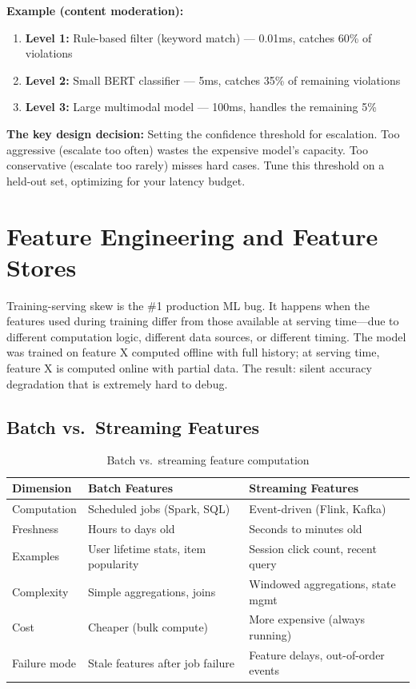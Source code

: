 \textbf{Example (content moderation):}
\begin{enumerate}
    \item \textbf{Level 1:} Rule-based filter (keyword match) --- 0.01ms, catches 60\% of violations
    \item \textbf{Level 2:} Small BERT classifier --- 5ms, catches 35\% of remaining violations
    \item \textbf{Level 3:} Large multimodal model --- 100ms, handles the remaining 5\%
\end{enumerate}

\textbf{The key design decision:} Setting the confidence threshold for escalation. Too aggressive (escalate too often) wastes the expensive model's capacity. Too conservative (escalate too rarely) misses hard cases. Tune this threshold on a held-out set, optimizing for your latency budget.

\section{Feature Engineering and Feature Stores}
\label{sec:feature_stores}

\begin{warningbox}
Training-serving skew is the \#1 production ML bug. It happens when the features used during training differ from those available at serving time---due to different computation logic, different data sources, or different timing. The model was trained on feature X computed offline with full history; at serving time, feature X is computed online with partial data. The result: silent accuracy degradation that is extremely hard to debug.
\end{warningbox}

\subsection{Batch vs.\ Streaming Features}

\begin{table}[H]
\centering
\caption{Batch vs.\ streaming feature computation}
\begin{tabularx}{\textwidth}{lXX}
\toprule
\textbf{Dimension} & \textbf{Batch Features} & \textbf{Streaming Features} \\
\midrule
Computation & Scheduled jobs (Spark, SQL) & Event-driven (Flink, Kafka) \\
Freshness & Hours to days old & Seconds to minutes old \\
Examples & User lifetime stats, item popularity & Session click count, recent query \\
Complexity & Simple aggregations, joins & Windowed aggregations, state mgmt \\
Cost & Cheaper (bulk compute) & More expensive (always running) \\
Failure mode & Stale features after job failure & Feature delays, out-of-order events \\
\bottomrule
\end{tabularx}
\end{table}

